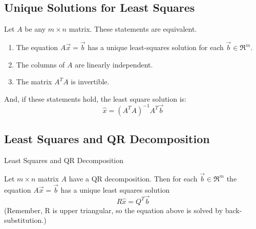 \subsection{Unique Solutions for Least Squares}
\begin{theorem}
    Let \(A\) be any \(m\times n\) matrix. These statements are equivalent.
    \begin{enumerate}
        \item The equation \(A\Vec{x} = \Vec{b}\) has a unique least-squares solution for each \(\Vec{b} \in \Re^m\).
        \item The columns of \(A\) are linearly independent.
        \item The matrix \(A^T A\) is invertible.
    \end{enumerate}
    And, if these statements hold, the least square solution is:
    \[\hat{x} = (A^T A)^{-1} A^T \Vec{b}\]
\end{theorem}

\subsection{Least Squares and QR Decomposition}
\begin{theorem} Least Squares and QR Decomposition

    Let \(m\times n\) matrix \(A\) have a QR decomposition. Then for each \(\Vec{b} \in \Re^m\) the equation \(A \Vec{x} = \Vec{b}\) has a unique least squares solution
    \[R \hat{x} = Q^T \Vec{b}\]
    (Remember, R is upper triangular, so the equation above is solved by back-substitution.)
\end{theorem}